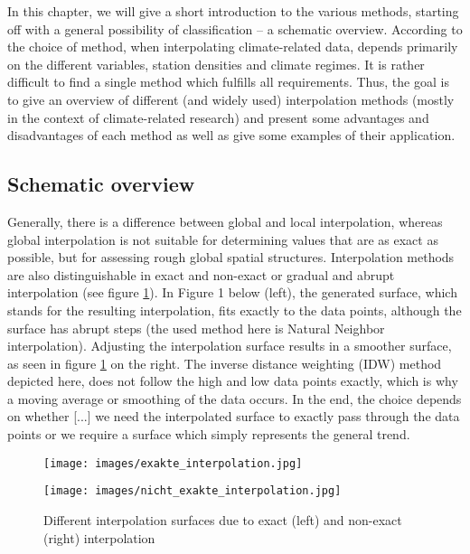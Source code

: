 In this chapter, we will give a short introduction to the various methods, starting off with a general possibility of classification – a schematic overview. According to \citeauthor{hofstra_comparison_2008} the choice of method, when interpolating climate-related data, depends primarily on the different variables, station densities and climate regimes. It is rather difficult to find a single method which fulfills all requirements. Thus, the goal is to give an overview of different (and widely used) interpolation methods (mostly in the context of climate-related research) and present some advantages and disadvantages of each method as well as give some examples of their application.

\subsection{Schematic overview}

Generally, there is a difference between global and local interpolation, whereas global interpolation is not suitable for determining values that are as exact as possible, but for assessing rough global spatial structures. \cite{gitta_raumliche_2016}
Interpolation methods are also distinguishable in exact and non-exact or gradual and abrupt interpolation (see figure \ref{fig:exact_non_exact_interploation}). In Figure 1 below (left), the generated surface, which stands for the resulting interpolation, fits exactly to the data points, although the surface has abrupt  \ldq{}steps\rdq{} (the used method here is Natural Neighbor interpolation). Adjusting the interpolation surface results in a smoother surface, as seen in figure \ref{fig:exact_non_exact_interploation} on the right.
The inverse distance weighting (IDW) method depicted here, does not follow the high and low data points exactly, which is why a \ldq{}moving average\rdq{} or \ldq{}smoothing\rdq{} of the data occurs. In the end, the choice depends on whether  \ldq{}[...] we need the interpolated surface to exactly pass through the data points or we require a surface which simply represents the general trend\rdq{}. \cite{wyatt_interpolation_nodate}



\begin{figure}
	\begin{minipage}[b]{.48\linewidth}
		\texttt{[image: images/exakte\_interpolation.jpg]}
	\end{minipage}
	\hfill
	\begin{minipage}[b]{.48\linewidth}
		\texttt{[image: images/nicht\_exakte\_interpolation.jpg]}
	\end{minipage}
	\caption{Different interpolation surfaces due to exact (left) and non-exact (right) interpolation\cite{gitta_raumliche_2016}}
	\label{fig:exact_non_exact_interploation}
\end{figure}

